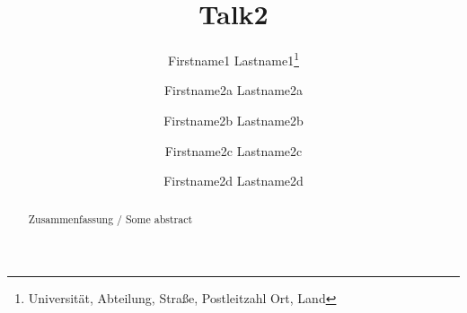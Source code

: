 \documentclass[]{lni}
\begin{document}
\title{Talk2}
\author[Firstname2a Lastname2a et al.]
{Firstname1 Lastname1\footnote{Universität, Abteilung, Straße, Postleitzahl Ort,
Land }\and
Firstname2a Lastname2a \and Firstname2b Lastname2b \and Firstname2c Lastname2c \and Firstname2d Lastname2d
}
\maketitle

\begin{abstract}
Zusammenfassung / Some abstract
\end{abstract}
\blinddocument
\end{document}
